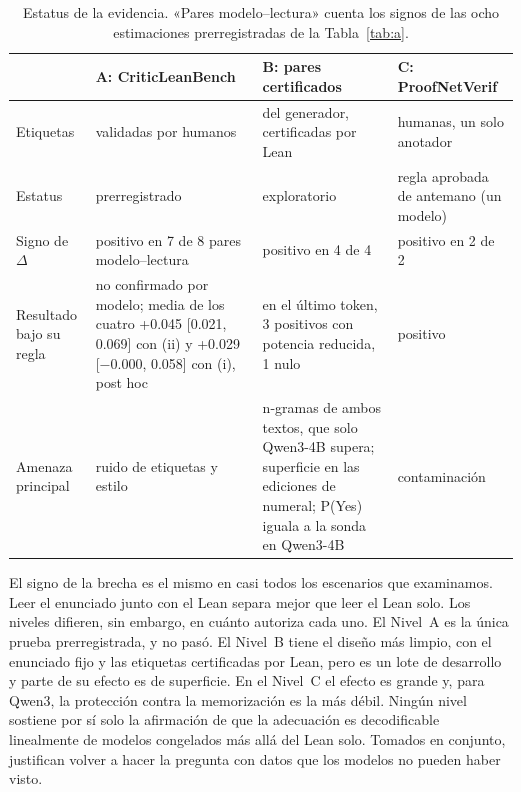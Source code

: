 \documentclass[10pt]{article}
\newcommand{\D}{\Delta}
\begin{document}
\begin{table}[h]
\centering
\caption{Estatus de la evidencia. «Pares modelo--lectura» cuenta los signos de las ocho estimaciones prerregistradas de la Tabla~\ref{tab:a}.}
\label{tab:conjunta}
\vspace{2pt}
\begin{tabularx}{\linewidth}{@{}lXXX@{}}
\toprule
 & A: CriticLeanBench & B: pares certificados & C: ProofNetVerif\\
\midrule
Etiquetas & validadas por humanos & del generador, certificadas por Lean & humanas, un solo anotador\\
Estatus & prerregistrado & exploratorio & regla aprobada de antemano (un modelo)\\
Signo de $\D$ & positivo en 7 de 8 pares modelo--lectura & positivo en 4 de 4 & positivo en 2 de 2\\
Resultado bajo su regla & no confirmado por modelo; media de los cuatro +0.045 [0.021, 0.069] con (ii) y +0.029 [−0.000, 0.058] con (i), post hoc & en el último token, 3 positivos con potencia reducida, 1 nulo & positivo\\
Amenaza principal & ruido de etiquetas y estilo & n-gramas de ambos textos, que solo Qwen3-4B supera; superficie en las ediciones de numeral; P(Yes) iguala a la sonda en Qwen3-4B & contaminación\\
\bottomrule
\end{tabularx}
\end{table}

El signo de la brecha es el mismo en casi todos los escenarios que examinamos. Leer el enunciado junto con el Lean
separa mejor que leer el Lean solo. Los niveles difieren, sin embargo, en cuánto autoriza cada uno. El Nivel~A es
la única prueba prerregistrada, y no pasó. El Nivel~B tiene el diseño más limpio, con el enunciado fijo y las
etiquetas certificadas por Lean, pero es un lote de desarrollo y parte de su efecto es de superficie. En el Nivel~C
el efecto es grande y, para Qwen3, la protección contra la memorización es la más débil. Ningún nivel sostiene por
sí solo la afirmación de que la adecuación es decodificable linealmente de modelos congelados más allá del Lean
solo.
Tomados en conjunto, justifican volver a hacer la pregunta con datos que los modelos no pueden haber visto.
\end{document}
